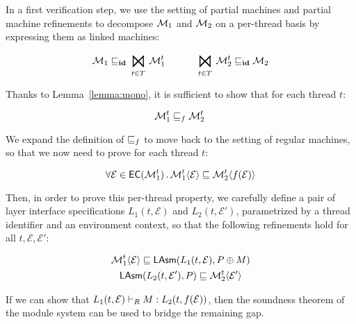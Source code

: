In a first verification step,
we use the setting of partial machines and partial machine refinements to 
decompose $\mathcal{M}_1$ and $\mathcal{M}_2$ on a per-thread basis
by expressing them as linked machines:
\begin{small}
\[
	\Mach_1 \refines_\id \bigJoin_{t \in T} \Mach_1^t  \hspace{3em}
	\bigJoin_{t \in T} \Mach_2^t \refines_\id \Mach_2
\]
\end{small}%
Thanks to Lemma~\ref{lemma:mono},
it is sufficient to show that for each thread $t$:
\begin{small}
\[
		\mathcal{M}_1^t \sqsubseteq_f \mathcal{M}_2^t \,
\]
\end{small}%
We expand the definition of $\sqsubseteq_f$
to move back to the setting of regular machines,
so that we now need to prove for each thread $t$:
\begin{small}
\[
	\forall \mathcal{E} \in {{\mathsf{EC}}({\mathcal{M}_1^t})}\,.\,
		\mathcal{M}_1^t \langle \mathcal{E} \rangle \sqsubseteq
		\mathcal{M}_2^t \langle f(\mathcal{E}) \rangle
\]
\end{small}%
Then, in order to prove this per-thread property,
we carefully define a pair of layer interface specifications
$L_1(t, \mathcal{E})$ and $L_2(t, \mathcal{E}')$,
parametrized by a thread identifier and an environment context,
so that the following refinements hold for all $t, \mathcal{E}, \mathcal{E}'$:
\begin{small}
\begin{gather*}
	\mathcal{M}_1^t \langle \mathcal{E} \rangle \sqsubseteq {\mathsf{LAsm}}(L_1(t, \mathcal{E}), P \oplus M) \\
	{\mathsf{LAsm}}(L_2(t, \mathcal{E}'), P) \sqsubseteq \mathcal{M}_2^t \langle \mathcal{E}' \rangle
\end{gather*}
\end{small}%
If we can show that
$ L_1(t, \mathcal{E}) \vdash_{R} M : L_2(t, f(\mathcal{E})) $,
then the soundness theorem of the module system
can be used to bridge the remaining gap.


